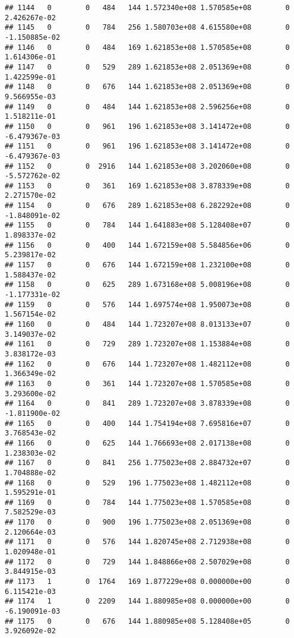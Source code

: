 \documentclass[
]{article}
\begin{document}
\begin{enumerate}
\begin{verbatim}
## 1144   0        0   484   144 1.572340e+08 1.570585e+08        0  2.426267e-02
## 1145   0        0   784   256 1.580703e+08 4.615580e+08        0 -1.150885e-02
## 1146   0        0   484   169 1.621853e+08 1.570585e+08        0  1.614306e-01
## 1147   0        0   529   289 1.621853e+08 2.051369e+08        0  1.422599e-01
## 1148   0        0   676   144 1.621853e+08 2.051369e+08        0  9.566955e-03
## 1149   0        0   484   144 1.621853e+08 2.596256e+08        0  1.518211e-01
## 1150   0        0   961   196 1.621853e+08 3.141472e+08        0 -6.479367e-03
## 1151   0        0   961   196 1.621853e+08 3.141472e+08        0 -6.479367e-03
## 1152   0        0  2916   144 1.621853e+08 3.202060e+08        0 -5.572762e-02
## 1153   0        0   361   169 1.621853e+08 3.878339e+08        0  2.271570e-02
## 1154   0        0   676   289 1.621853e+08 6.282292e+08        0 -1.848091e-02
## 1155   0        0   784   144 1.641883e+08 5.128408e+07        0  1.898337e-02
## 1156   0        0   400   144 1.672159e+08 5.584856e+06        0  5.239817e-02
## 1157   0        0   676   144 1.672159e+08 1.232100e+08        0  1.588437e-02
## 1158   0        0   625   289 1.673168e+08 5.008196e+08        0 -1.177331e-02
## 1159   0        0   576   144 1.697574e+08 1.950073e+08        0  1.567154e-02
## 1160   0        0   484   144 1.723207e+08 8.013133e+07        0  3.149037e-02
## 1161   0        0   729   289 1.723207e+08 1.153884e+08        0  3.838172e-03
## 1162   0        0   676   144 1.723207e+08 1.482112e+08        0  1.366349e-02
## 1163   0        0   361   144 1.723207e+08 1.570585e+08        0  3.293600e-02
## 1164   0        0   841   289 1.723207e+08 3.878339e+08        0 -1.811900e-02
## 1165   0        0   400   144 1.754194e+08 7.695816e+07        0  3.768543e-02
## 1166   0        0   625   144 1.766693e+08 2.017138e+08        0  1.238303e-02
## 1167   0        0   841   256 1.775023e+08 2.884732e+07        0  1.704888e-02
## 1168   0        0   529   196 1.775023e+08 1.482112e+08        0  1.595291e-01
## 1169   0        0   784   144 1.775023e+08 1.570585e+08        0  7.582529e-03
## 1170   0        0   900   196 1.775023e+08 2.051369e+08        0  2.120664e-03
## 1171   0        0   576   144 1.820745e+08 2.712938e+08        0  1.020948e-01
## 1172   0        0   729   144 1.848866e+08 2.507029e+08        0  3.844915e-03
## 1173   1        0  1764   169 1.877229e+08 0.000000e+00        0  6.115421e-03
## 1174   1        0  2209   144 1.880985e+08 0.000000e+00        0 -6.190091e-03
## 1175   0        0   676   144 1.880985e+08 5.128408e+05        0  3.926092e-02

\end{verbatim}
\end{enumerate}
\end{document}
